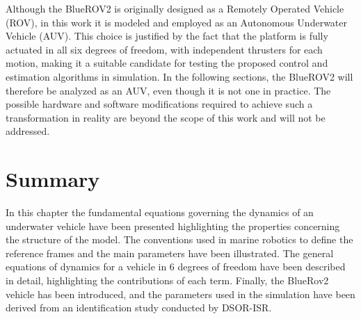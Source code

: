 Although the BlueROV2 is originally designed as a Remotely Operated Vehicle (ROV), in this work it is modeled and employed as an Autonomous Underwater Vehicle (AUV). 
This choice is justified by the fact that the platform is fully actuated in all six degrees of freedom, with independent thrusters for each motion, making it a 
suitable candidate for testing the proposed control and estimation algorithms in simulation. In the following sections, the BlueROV2 will therefore be analyzed as 
an AUV, even though it is not one in practice. The possible hardware and software modifications required to achieve such a transformation in reality are beyond the 
scope of this work and will not be addressed.

\section{Summary}
In this chapter the fundamental equations governing the dynamics of an underwater vehicle have been presented highlighting the properties concerning the structure of the model. The conventions used in marine robotics to define
the reference frames and the main parameters have been illustrated. The general equations of dynamics for a vehicle in 6 degrees of freedom have been described
in detail, highlighting the contributions of each term. Finally, the BlueRov2 vehicle has been introduced, and the parameters used in the simulation have been 
derived from an identification study conducted by DSOR-ISR.


